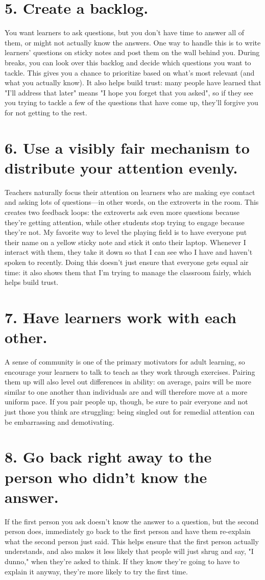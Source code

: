 \documentclass[10pt,letterpaper]{article}
\newcommand{\rulemajor}[1]{\section{#1}}
\begin{document}
\rulemajor{5. Create a backlog.}

You want learners to ask questions, but you don't have time to answer all of them,
or might not actually know the answers.
One way to handle this is to write learners' questions on sticky notes and post them on the wall behind you.
During breaks,
you can look over this backlog and decide which questions you want to tackle.
This gives you a chance to prioritize based on what's most relevant (and what you actually know).
It also helps build trust:
many people have learned that "I'll address that later" means "I hope you forget that you asked",
so if they see you trying to tackle a few of the questions that have come up,
they'll forgive you for not getting to the rest.

\rulemajor{6. Use a visibly fair mechanism to distribute your attention evenly.}

Teachers naturally focus their attention on learners who are making eye contact and asking lots of questions---in other words,
on the extroverts in the room.
This creates two feedback loops:
the extroverts ask even more questions because they're getting attention,
while other students stop trying to engage because they're not.
My favorite way to level the playing field is to have everyone put their name on a yellow sticky note
and stick it onto their laptop.
Whenever I interact with them, they take it down
so that I can see who I have and haven't spoken to recently.
Doing this doesn't just ensure that everyone gets equal air time:
it also shows them that I'm trying to manage the classroom fairly,
which helps build trust.

\rulemajor{7. Have learners work with each other.}

A sense of community is one of the primary motivators for adult learning,
so encourage your learners to talk to teach as they work through exercises.
Pairing them up will also level out differences in ability:
on average, pairs will be more similar to one another than individuals are
and will therefore move at a more uniform pace.
If you pair people up, though, be sure to pair everyone and not just those you think are struggling:
being singled out for remedial attention can be embarrassing and demotivating.

\rulemajor{8. Go back right away to the person who didn't know the answer.}

If the first person you ask doesn't know the answer to a question,
but the second person does,
immediately go back to the first person and have them re-explain
what the second person just said.
This helps ensure that the first person actually understands,
and also makes it less likely that people will just shrug and say, "I dunno," when they're asked to think.
If they know they're going to have to explain it anyway,
they're more likely to try the first time.
\end{document}
